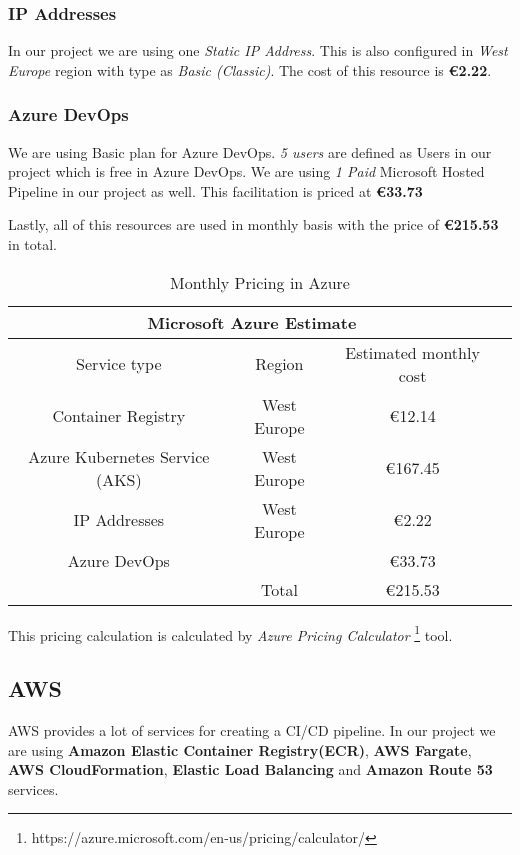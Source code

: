 \subsubsection{IP Addresses}

In our project we are using one \textit{Static IP Address}. This is also configured in \textit{West Europe} region with type as \textit{Basic (Classic)}. The cost of this resource is \textbf{€2.22}.

\subsubsection{Azure DevOps}

We are using Basic plan for Azure DevOps. \textit{5 users} are defined as Users in our project which is free in Azure DevOps. We are using \textit{1 Paid} Microsoft Hosted Pipeline in our project as well. This facilitation is priced at \textbf{€33.73}

Lastly, all of this resources are used in monthly basis with the price of \textbf{€215.53} in total.

\begin{table}[h!]
    \centering
    \begin{tabular}{ |c|c|c|c|  }
     \hline
     \multicolumn{3}{|c|}{Microsoft Azure Estimate} \\
     \hline
     Service type & Region & Estimated monthly cost\\
     \hline
     Container Registry   & West Europe   &   €12.14\\
     Azure Kubernetes Service (AKS)&   West Europe  & €167.45\\
     IP Addresses &West Europe & €2.22\\
     Azure DevOps    & &  €33.73\\
     \hline
     \hline
      &    Total&€215.53\\
     \hline
    \end{tabular}
    \caption{Monthly Pricing in Azure}
    \label{tab:table_1}
\end{table}

This pricing calculation is calculated by \textit{Azure Pricing Calculator} \footnote{https://azure.microsoft.com/en-us/pricing/calculator/} tool.

\subsection{AWS}

AWS provides a lot of services for creating a CI/CD pipeline. In our project we are using \textbf{Amazon Elastic Container Registry(ECR)}, \textbf{AWS Fargate}, \textbf{AWS CloudFormation}, \textbf{Elastic Load Balancing} and \textbf{Amazon Route 53} services.

